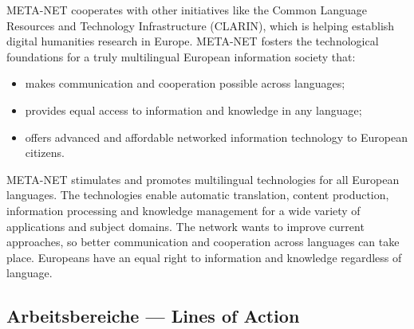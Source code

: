 \documentclass[]{../../metanetpaper}
\begin{document}
\begin{Parallel}[c]{80mm}{80mm}
{    META-NET cooperates with other initiatives like the Common Language Resources and Technology Infrastructure (CLARIN), which is helping establish digital humanities research in Europe. META-NET fosters the technological foundations for a truly multilingual European information society that:
    \begin{itemize}
      \item makes communication and cooperation possible across languages;
      \item provides equal access to information and knowledge in any language;
      \item offers advanced and affordable networked information technology to European citizens.
    \end{itemize}
    META-NET stimulates and promotes multilingual technologies for all European languages. The technologies enable automatic translation, content production, information processing and knowledge management for a wide variety of applications and subject domains. The network wants to improve current approaches, so better communication and cooperation across languages can take place. Europeans have an equal right to information and knowledge regardless of language. 
  }

  \ParallelPar


  \subsection{Arbeitsbereiche --- Lines of Action}


\end{Parallel}
\end{document}
